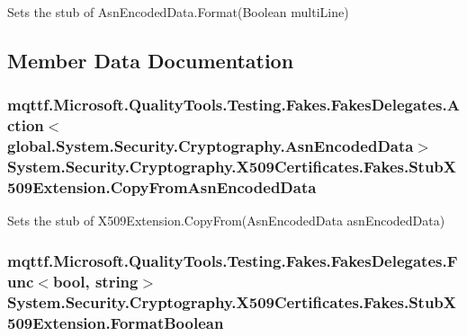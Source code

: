 Sets the stub of Asn\-Encoded\-Data.\-Format(\-Boolean multi\-Line)



\subsection{Member Data Documentation}
\hypertarget{class_system_1_1_security_1_1_cryptography_1_1_x509_certificates_1_1_fakes_1_1_stub_x509_extension_ad9969a3ff9ecca4a1410d5a75dc2c607}{
\subsubsection[{Copy\-From\-Asn\-Encoded\-Data}]{\setlength{\rightskip}{0pt plus 5cm}mqttf.\-Microsoft.\-Quality\-Tools.\-Testing.\-Fakes.\-Fakes\-Delegates.\-Action$<$global.\-System.\-Security.\-Cryptography.\-Asn\-Encoded\-Data$>$ System.\-Security.\-Cryptography.\-X509\-Certificates.\-Fakes.\-Stub\-X509\-Extension.\-Copy\-From\-Asn\-Encoded\-Data}}\label{class_system_1_1_security_1_1_cryptography_1_1_x509_certificates_1_1_fakes_1_1_stub_x509_extension_ad9969a3ff9ecca4a1410d5a75dc2c607}


Sets the stub of X509\-Extension.\-Copy\-From(\-Asn\-Encoded\-Data asn\-Encoded\-Data)

\hypertarget{class_system_1_1_security_1_1_cryptography_1_1_x509_certificates_1_1_fakes_1_1_stub_x509_extension_aa74b601af3993add72580520dc4fa92e}{
\subsubsection[{Format\-Boolean}]{\setlength{\rightskip}{0pt plus 5cm}mqttf.\-Microsoft.\-Quality\-Tools.\-Testing.\-Fakes.\-Fakes\-Delegates.\-Func$<$bool, string$>$ System.\-Security.\-Cryptography.\-X509\-Certificates.\-Fakes.\-Stub\-X509\-Extension.\-Format\-Boolean}}\label{class_system_1_1_security_1_1_cryptography_1_1_x509_certificates_1_1_fakes_1_1_stub_x509_extension_aa74b601af3993add72580520dc4fa92e}


